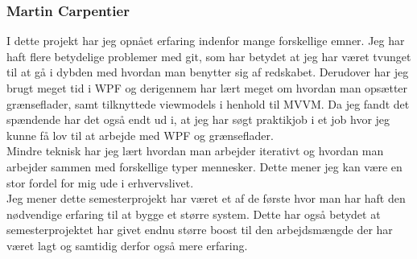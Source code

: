 \subsubsection{Martin Carpentier}

I dette projekt har jeg opnået erfaring indenfor mange forskellige emner. Jeg har haft flere betydelige problemer med git, som har betydet at jeg har været tvunget til at gå i dybden med hvordan man benytter sig af redskabet. Derudover har jeg brugt meget tid i WPF og derigennem har lært meget om hvordan man opsætter grænseflader, samt tilknyttede viewmodels i henhold til MVVM. Da jeg fandt det spændende har det også endt ud i, at jeg har søgt praktikjob i et job hvor jeg kunne få lov til at arbejde med WPF og grænseflader. \\
Mindre teknisk har jeg lært hvordan man arbejder iterativt og hvordan man arbejder sammen med forskellige typer mennesker. Dette mener jeg kan være en stor fordel for mig ude i erhvervslivet.\\

Jeg mener dette semesterprojekt har været et af de første hvor man har haft den nødvendige erfaring til at bygge et større system. Dette har også betydet at semesterprojektet har givet endnu større boost til den arbejdsmængde der har været lagt  og samtidig derfor også mere erfaring.
